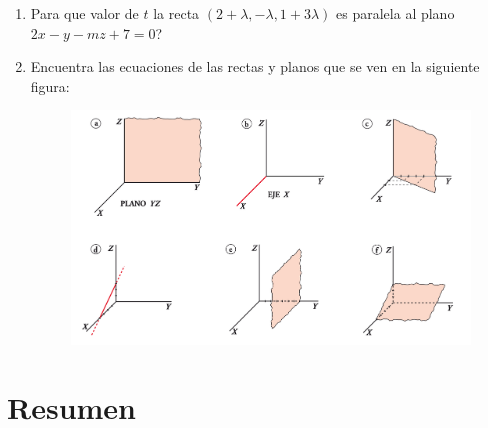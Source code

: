 \begin{enumerate}[Q1. ]
\item Para que valor de $t$ la recta $(2+\lambda,-\lambda,1+3\lambda)$ es paralela al plano $2x-y-mz+7=0$?

\hspace{-10mm}

\item Encuentra las ecuaciones de las rectas y planos que se ven en la siguiente figura:

\begin{figure}[H]
		\centering
		\includegraphics[width=1\textwidth]{imagenes/imagenes10/T10IM26.png}
 	\end{figure}

\vspace{2mm} \hspace{-10mm}

\end{enumerate}








\clearpage
\section{Resumen}




